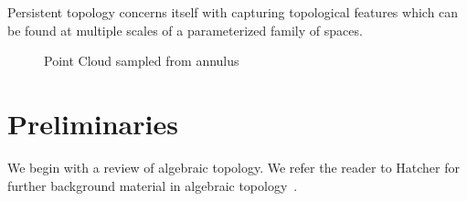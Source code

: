 Persistent topology concerns itself with capturing topological features which can be found at multiple scales of a parameterized family of spaces.
\begin{figure}
\centering
{}      
 \hspace{.5cm}
 \caption{Point Cloud sampled from annulus}
\label{fig:point-cloud-annulus}
 \end{figure}
\section{Preliminaries}
We begin with a review of algebraic topology. We refer the reader to Hatcher for further background material in algebraic topology~\cite{hatcher}.
